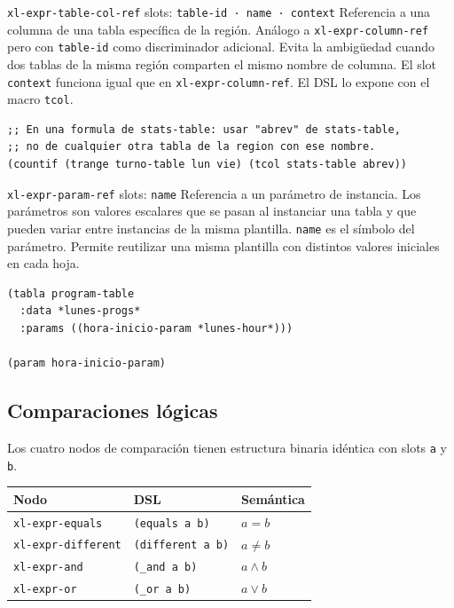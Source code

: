 \documentclass[12pt,a4paper]{report}
\begin{document}
\vspace{0.5em}

\begin{nodobox}{\texttt{xl-expr-table-col-ref} \quad \small\textmd{slots:} \texttt{table-id · name · context}}
Referencia a una columna de una tabla específica de la región. Análogo a \texttt{xl-expr-column-ref} pero con \texttt{table-id} como discriminador adicional. Evita la ambigüedad cuando dos tablas de la misma región comparten el mismo nombre de columna. El slot \texttt{context} funciona igual que en \texttt{xl-expr-column-ref}. El DSL lo expone con el macro \texttt{tcol}.

\begin{lstlisting}
;; En una formula de stats-table: usar "abrev" de stats-table,
;; no de cualquier otra tabla de la region con ese nombre.
(countif (trange turno-table lun vie) (tcol stats-table abrev))
\end{lstlisting}
\end{nodobox}

\vspace{0.5em}

\begin{nodobox}{\texttt{xl-expr-param-ref} \quad \small\textmd{slots:} \texttt{name}}
Referencia a un parámetro de instancia. Los parámetros son valores escalares que se pasan al instanciar una tabla y que pueden variar entre instancias de la misma plantilla. \texttt{name} es el símbolo del parámetro. Permite reutilizar una misma plantilla con distintos valores iniciales en cada hoja.

\begin{lstlisting}
(tabla program-table
  :data *lunes-progs*
  :params ((hora-inicio-param *lunes-hour*)))

(param hora-inicio-param)
\end{lstlisting}
\end{nodobox}

\subsection{Comparaciones lógicas}

Los cuatro nodos de comparación tienen estructura binaria idéntica con slots \texttt{a} y \texttt{b}.

\begin{center}
\begin{tabular}{lll}
\toprule
\textbf{Nodo} & \textbf{DSL} & \textbf{Semántica} \\
\midrule
\texttt{xl-expr-equals}    & \texttt{(equals a b)}   & $a = b$ \\
\texttt{xl-expr-different} & \texttt{(different a b)}& $a \neq b$ \\
\texttt{xl-expr-and}       & \texttt{(\_and a b)}     & $a \land b$ \\
\texttt{xl-expr-or}        & \texttt{(\_or a b)}      & $a \lor b$ \\
\bottomrule
\end{tabular}
\end{center}
\end{document}

